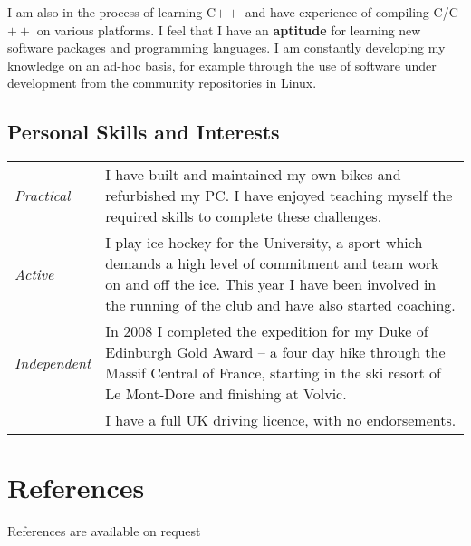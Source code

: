\documentclass[a4paper]{article}
\begin{document}
I am also in the process of learning C$++$ and have experience of compiling C/C$++$ on various platforms. I feel that I have an {\bf aptitude} for learning new software packages and programming languages. I am constantly developing my knowledge on an ad-hoc basis, for example  through the use of software under development from the community repositories in Linux.

\subsection*{Personal Skills and Interests}

\hspace{-6pt}\begin{tabular}{>{\it}lp{430pt}}
Practical & I have built and maintained my own bikes and refurbished my PC. I have enjoyed teaching myself the required skills to complete these challenges. \\[4pt]
Active & I play ice hockey for the University, a sport which demands a high level of commitment and team work on and off the ice. This year I have been involved in the running of the club and have also started coaching. \\[4pt]
Independent & In 2008 I completed the expedition for my Duke of Edinburgh Gold Award -- a four day hike through the Massif Central of France, starting in the ski resort of Le Mont-Dore and finishing at Volvic. \\[4pt]
& I have a full UK driving licence, with no endorsements.
\end{tabular}

\section*{References}

References are available on request


\end{document}
